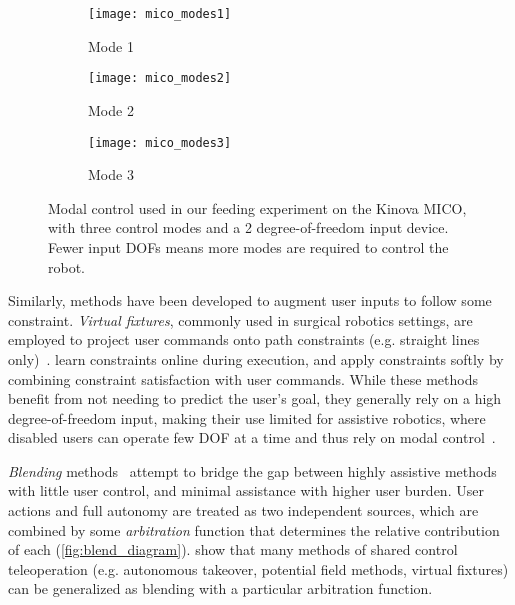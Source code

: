 \begin{figure}
  \begin{subfigure}[b]{.32\linewidth}
    \texttt{[image: mico\_modes1]}
    \caption{Mode 1}
  \end{subfigure}
  \begin{subfigure}[b]{.32\linewidth}
    \texttt{[image: mico\_modes2]}
    \caption{Mode 2}
  \end{subfigure}
  \begin{subfigure}[b]{.32\linewidth}
    \texttt{[image: mico\_modes3]}
    \caption{Mode 3}
  \end{subfigure}
  \caption{Modal control used in our feeding experiment on the Kinova MICO, with three control modes and a 2 degree-of-freedom input device. Fewer input DOFs means more modes are required to control the robot.}
  \label{fig:control_modes}
\end{figure}

Similarly, methods have been developed to augment user inputs to follow some constraint. \emph{Virtual fixtures}, commonly used in surgical robotics settings, are employed to project user commands onto path constraints (e.g. straight lines only)~\citep{park_2001,li_2003, marayong_2003, kragic_2005, aarno_2005_virtualfixtures, li_2007}. \citet{mehr_2016} learn constraints online during execution, and apply constraints softly by combining constraint satisfaction with user commands. While these methods benefit from not needing to predict the user's goal, they generally rely on a high degree-of-freedom input, making their use limited for assistive robotics, where disabled users can operate few DOF at a time and thus rely on modal control~\citep{herlant_2016}.

\emph{Blending} methods~\citep{dragan_2013_assistive} attempt to bridge the gap between highly assistive methods with little user control, and minimal assistance with higher user burden. User actions and full autonomy are treated as two independent sources, which are combined by some \emph{arbitration} function that determines the relative contribution of each (\cref{fig:blend_diagram}). \citet{dragan_2013_assistive} show that many methods of shared control teleoperation (e.g. autonomous takeover, potential field methods, virtual fixtures) can be generalized as blending with a particular arbitration function. 

